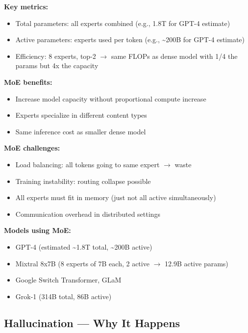\documentclass[11pt]{article}
\providecommand{\tightlist}{\setlength{\itemsep}{1pt}\setlength{\parskip}{0pt}}
\begin{document}
\textbf{Key metrics:}

\begin{itemize}
\tightlist
\item
  Total parameters: all experts combined (e.g., 1.8T for GPT-4 estimate)
\item
  Active parameters: experts used per token (e.g., \textasciitilde200B for GPT-4 estimate)
\item
  Efficiency: 8 experts, top-2 \(\rightarrow\) same FLOPs as dense model with 1/4 the params but 4x the capacity
\end{itemize}

\textbf{MoE benefits:}

\begin{itemize}
\tightlist
\item
  Increase model capacity without proportional compute increase
\item
  Experts specialize in different content types
\item
  Same inference cost as smaller dense model
\end{itemize}

\textbf{MoE challenges:}

\begin{itemize}
\tightlist
\item
  Load balancing: all tokens going to same expert \(\rightarrow\) waste
\item
  Training instability: routing collapse possible
\item
  All experts must fit in memory (just not all active simultaneously)
\item
  Communication overhead in distributed settings
\end{itemize}

\textbf{Models using MoE:}

\begin{itemize}
\tightlist
\item
  GPT-4 (estimated \textasciitilde1.8T total, \textasciitilde200B active)
\item
  Mixtral 8x7B (8 experts of 7B each, 2 active \(\rightarrow\) 12.9B active params)
\item
  Google Switch Transformer, GLaM
\item
  Grok-1 (314B total, 86B active)
\end{itemize}

\subsection{Hallucination --- Why It Happens}\label{hallucination--why-it-happens}
\end{document}
